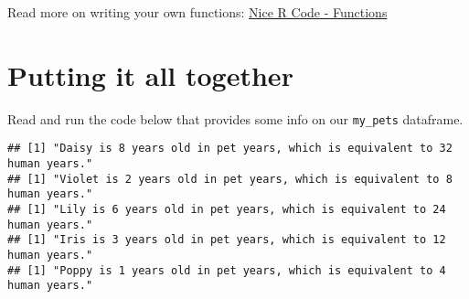 \documentclass[]{book}
\newenvironment{Shaded}{\begin{snugshade}}{\end{snugshade}}
\newcommand{\CommentTok}[1]{\textcolor[rgb]{0.56,0.35,0.01}{\textit{#1}}}
\newcommand{\ControlFlowTok}[1]{\textcolor[rgb]{0.13,0.29,0.53}{\textbf{#1}}}
\newcommand{\DecValTok}[1]{\textcolor[rgb]{0.00,0.00,0.81}{#1}}
\newcommand{\KeywordTok}[1]{\textcolor[rgb]{0.13,0.29,0.53}{\textbf{#1}}}
\newcommand{\NormalTok}[1]{#1}
\newcommand{\OperatorTok}[1]{\textcolor[rgb]{0.81,0.36,0.00}{\textbf{#1}}}
\newcommand{\StringTok}[1]{\textcolor[rgb]{0.31,0.60,0.02}{#1}}
\begin{document}
Read more on writing your own functions: \href{https://nicercode.github.io/guides/functions/}{Nice R Code - Functions}

\hypertarget{putting-it-all-together}{%
\section{Putting it all together}\label{putting-it-all-together}}

Read and run the code below that provides some info on our \texttt{my\_pets} dataframe.

\begin{Shaded}
\end{Shaded}

\begin{verbatim}
## [1] "Daisy is 8 years old in pet years, which is equivalent to 32 human years."
## [1] "Violet is 2 years old in pet years, which is equivalent to 8 human years."
## [1] "Lily is 6 years old in pet years, which is equivalent to 24 human years."
## [1] "Iris is 3 years old in pet years, which is equivalent to 12 human years."
## [1] "Poppy is 1 years old in pet years, which is equivalent to 4 human years."
\end{verbatim}

\begin{Shaded}
\end{Shaded}
\end{document}
